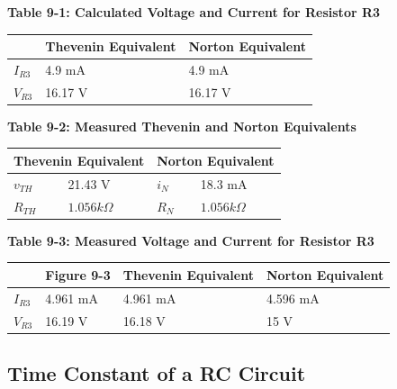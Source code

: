 \documentclass[a4paper]{article}
\begin{document}
\begin{center}
    \small\textbf{Table 9-1: Calculated Voltage and Current for Resistor R3}
    \begin{tabular}{|p{3 cm}|p{3cm}|p{3 cm}|}
        \hline
         & Thevenin Equivalent & Norton Equivalent\\
        \hline
        $I_{R3}$ & 4.9 mA & 4.9 mA  \\
        \hline
        $V_{R3}$ & 16.17 V & 16.17 V  \\
        \hline
        
    \end{tabular}
\end{center}

\begin{center}
    \small\textbf{Table 9-2: Measured Thevenin and Norton Equivalents}
    \begin{tabular}{|p{3 cm}|p{3cm}|p{3 cm}|p{3 cm}|}      
        \hline
        \multicolumn{2}{|c|}{Thevenin Equivalent} & \multicolumn{2}{|c|}{Norton Equivalent}  \\
        \hline
        $v_{TH}$ & 21.43 V & $i_{N}$ & 18.3 mA \\
        \hline
        $R_{TH}$ & $1.056k\Omega$ & $R_{N}$ & $1.056k\Omega$ \\
        \hline
    \end{tabular}
\end{center}

\begin{center}
    \small\textbf{Table 9-3: Measured Voltage and Current for Resistor R3}
    \begin{tabular}{|p{3 cm}|p{3 cm}|p{3 cm}|p{3 cm}|}
        \hline
        & Figure 9-3 & Thevenin Equivalent & Norton Equivalent \\
        \hline
        $I_{R3}$ & 4.961 mA & 4.961 mA & 4.596 mA \\
        \hline
        $V_{R3}$ & 16.19 V & 16.18 V & 15 V\\
        \hline
    \end{tabular}
\end{center}
\pagebreak
\subsection{Time Constant of a RC Circuit}
\end{document}
